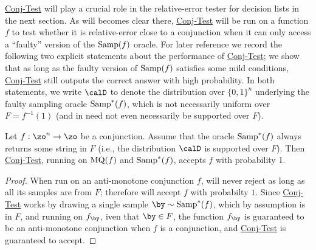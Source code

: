\documentclass[11pt]{article}
\theoremstyle{definition}
\begin{document}
\hyperlink{Algorithm2}{\sc Conj-Test} will play a crucial role in the relative-error
  tester for decision lists in the next section.
As will becomes clear there, \hyperlink{Algorithm2}{\sc Conj-Test} will be run
  on a function $f$ to test whether it is relative-error close to a conjunction when it can only
  access a ``faulty''
  version of the $\mathrm{Samp}(f)$ oracle.
For later reference we record the following two explicit statements about
  the performance of \hyperlink{Algorithm2}{\sc Conj-Test};
  we show that as long as the faulty version of $\mathrm{Samp}(f)$ satisfies some mild conditions,
  \hyperlink{Algorithm2}{\sc Conj-Test} still outputs the correct answer with high probability.
In both statements, we write $\calD$ to denote the distribution over $\{0,1\}^n$
  underlying the faulty sampling oracle $\mathrm{Samp}^*(f)$, which is not necessarily
  uniform over $F=f^{-1}(1)$ (and {in } need not even necessarily be supported over $F$).












\begin{theorem}\label{thm: accept weaker assumption}
    Let $f: \zo^n \to \zo$ be a conjunction.
Assume that the oracle $\mathrm{Samp}^\ast(f)$ always returns some string in $F$ (i.e., the  distribution $\calD$ is supported over $F$).
Then \hyperlink{Algorithm2}{\sc Conj-Test}, running on $\mathrm{MQ}(f)$ and $\mathrm{Samp}^*(f)$,
accepts $f$ with probability 1.
\end{theorem}
\begin{proof}
When run on an anti-monotone conjunction $f$,  
 will never reject as long as all its samples are from $F$; therefore  will accept $f$ with probabilty $1$. 
Since \hyperlink{Algorithm2}{\sc Conj-Test} works by drawing a single sample $\by \sim \SAMP^*(f)$, which by assumption is in $F$, and running  on $f_{\by}$, iven that $\by \in F$, the function $f_{\by}$ is guaranteed to be an anti-monotone conjunction when $f$ is a conjunction, and \hyperlink{Algorithm2}{\sc Conj-Test} is guaranteed to accept.
\end{proof}
\end{document}
